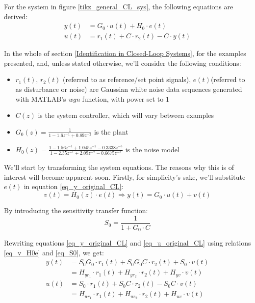 \documentclass[  10pt, twoside]{report} %
\numberwithin{equation}{chapter}
\begin{document}
For the system in figure \ref{tikz_general_CL_sys}, the following equations are derived:
\begin{align} %
    y(t) &= G_0 \cdot u(t) + H_0 \cdot e(t) \label{eq_y_original_CL} \\ 
    u(t) &= r_1(t) + C \cdot r_2(t) - C \cdot y(t) \label{eq_u_original_CL}
\end{align} %

In the whole of section \ref{Identification in Closed-Loop Systems}, for the examples presented, and, unless stated otherwise, we'll consider the following conditions:
\begin{itemize}
    \item $r_{1}(t)$, $r_{2}(t)$ (referred to as reference/set point signals), $e(t)$(referred to as disturbance or noise) are Gaussian white noise data sequences generated with MATLAB's \emph{wgn} function, with power set to 1
    \item $C(z)$ is the system controller, which will vary between examples
    \item $G_{0}(z) = \frac{1}{1-1.6z^{-1}+0.89z^{-2}}$ is the plant
    \item $H_{0}(z) = \frac{1 - 1.56z^{-1} + 1.045z^{-2} -0.3338z^{-3}}{1 - 2.35z^{-1} + 2.09z^{-2} -0.6675z^{-3}}$ is the noise model
\end{itemize}

We'll start by transforming the system equations. The reasons why this is of interest will become apparent soon. Firstly, for simplicity's sake, we'll substitute $e(t)$  in equation \eqref{eq_y_original_CL}:
\begin{equation}
    v(t) = H_{0}(z) \cdot e(t) \Longrightarrow y(t) = G_0 \cdot u(t) + v(t) \label{eq_v_H0e}
\end{equation}

By introducing the sensitivity transfer function:
\begin{equation}
    S_0 = \frac{1}{1 + G_0 \cdot C} \label{eq_S0}
\end{equation}

Rewriting equations \eqref{eq_y_original_CL} and \eqref{eq_u_original_CL} using relations \eqref{eq_v_H0e} and \eqref{eq_S0}, we get:
\begin{align}
    y(t) &= S_0 G_0 \cdot r_1(t) + S_0 G_0 C \cdot r_2(t)  + S_0 \cdot v(t) \label{eq_y_transformed_CL} \\  
         &= H_{yr_{1}} \cdot r_1(t) + H_{yr_{2}} \cdot r_2(t) + H_{yv} \cdot v(t) \nonumber \\[2mm]
    u(t) &= S_0 \cdot r_1(t) + S_0 C \cdot r_2(t) - S_{0}C \cdot v(t)   \label{eq_u_transformed_CL}  \\
         &= H_{ur_{1}} \cdot r_1(t) + H_{ur_{2}} \cdot r_2(t) + H_{uv} \cdot v(t) \nonumber
 \end{align}
\end{document}
